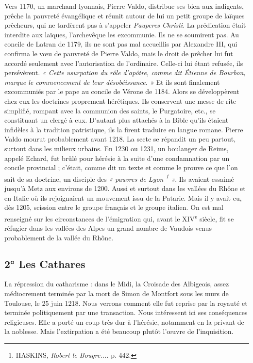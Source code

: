 \documentclass[french,twoside]{book} %
\begin{document}
Vers 1170, un marchand lyonnais, Pierre Valdo, distribue ses bien aux indigents, prêche la pauvreté évangélique et réunit autour de lui un petit groupe de laïques prêcheurs, qui ne tardèrent pas à s’appeler {\itshape Pauperes Christi}. La prédication était interdite aux laïques, l’archevêque les excommunie. Ils ne se soumirent pas. Au concile de Latran de 1179, ils ne sont pas mal accueillis par Alexandre III, qui confirma le vœu de pauvreté de Pierre Valdo, mais le droit de prêcher lui fut accordé seulement avec l’autorisation de l’ordinaire. Celle-ci lui étant refusée, ils persévèrent. \emph{« Cette usurpation du rôle d’apôtre, comme dit Étienne de Bourbon, marque le commencement de leur désobéissance. »} Et ils sont finalement excommuniés par le pape au concile de Vérone de 1184. Alors se développèrent chez eux les doctrines proprement hérétiques. Ils conservent une messe de rite simplifié, rompant avec la communion des saints, le Purgatoire, etc., se constituant un clergé à eux. D’autant plus attachés à la Bible qu’ils étaient infidèles à la tradition patristique, ils la firent traduire en langue romane. Pierre Valdo mourut probablement avant 1218. La secte se répandit un peu partout, surtout dans les milieux urbains. En 1230 ou 1231, un boulanger de Reims, appelé Echard, fut brûlé pour hérésie à la suite d’une condamnation par un concile provincial ; c’était, comme dit un texte et comme le prouve ce que l’on sait de sa doctrine, un disciple des \emph{« pauvres de Lyon \footnote{ HASKINS, {\itshape Robert le Bougre....} p. 442.} »}. Ils avaient essaimé jusqu’à Metz aux environs de 1200. Aussi et surtout dans les vallées du Rhône et en Italie où ils rejoignaient un mouvement issu de la Patarie. Mais il y avait eu, dès 1205, scission entre le groupe français et le groupe italien. On est mal renseigné sur les circonstances de l’émigration qui, avant le XIV\textsuperscript{e} siècle, fit se réfugier dans les vallées des Alpes un grand nombre de Vaudois venus probablement de la vallée du Rhône.
\subsection[2° Les Cathares]{2° Les Cathares \protect\footnotemark}
\noindent La répression du catharisme : dans le Midi, la Croisade des Albigeois, assez médiocrement terminée par la mort de Simon de  
\label{p104} Montfort sous les murs de Toulouse, le 25 juin 1218. Nous verrons comment elle fut reprise par la royauté et terminée politiquement par une transaction. Nous intéressent ici ses conséquences religieuses. Elle a porté un coup très dur à l’hérésie, notamment en la privant de la noblesse. Mais l’extirpation a été beaucoup plutôt l’œuvre de l’inquisition.
\end{document}
